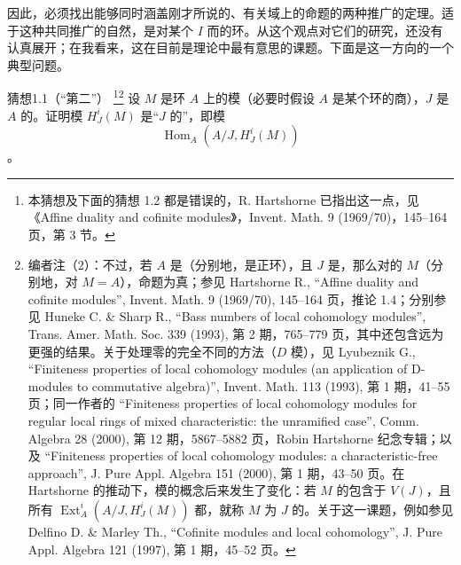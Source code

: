 因此，必须找出能够同时涵盖刚才所说的、有关域上的命题的两种推广的定理。适于这种共同推广的自然，是对某个 $I$ 而的环。从这个观点对它们的研究，还没有认真展开；在我看来，这在目前是理论中最有意思的课题。下面是这一方向的一个典型问题。

\begin{SGAresult}{猜想}{1.1（“第二”）}
\footnote{本猜想及下面的猜想 1.2 都是错误的，R. Hartshorne 已指出这一点，见《Affine duality and cofinite modules》，Invent. Math. 9 (1969/70)，145--164 页，第 3 节。}\footnote{编者注（2）：不过，若 $A$ 是（分别地，是正环），且 $J$ 是，那么对的 $M$（分别地，对 $M=A$），命题为真；参见 Hartshorne R., “Affine duality and cofinite modules”, Invent. Math. 9 (1969/70), 145--164 页，推论 1.4；分别参见 Huneke C. \& Sharp R., “Bass numbers of local cohomology modules”, Trans. Amer. Math. Soc. 339 (1993), 第 2 期，765--779 页，其中还包含远为更强的结果。关于处理零的完全不同的方法（$D$ 模），见 Lyubeznik G., “Finiteness properties of local cohomology modules (an application of D-modules to commutative algebra)”, Invent. Math. 113 (1993), 第 1 期，41--55 页；同一作者的 “Finiteness properties of local cohomology modules for regular local rings of mixed characteristic: the unramified case”, Comm. Algebra 28 (2000), 第 12 期，5867--5882 页，Robin Hartshorne 纪念专辑；以及 “Finiteness properties of local cohomology modules: a characteristic-free approach”, J. Pure Appl. Algebra 151 (2000), 第 1 期，43--50 页。在 Hartshorne 的推动下，模的概念后来发生了变化：若 $M$ 的包含于 $V(J)$，且所有 $\operatorname{Ext}^i_A(A/J,H^i_J(M))$ 都，就称 $M$ 为 $J$ 的。关于这一课题，例如参见 Delfino D. \& Marley Th., “Cofinite modules and local cohomology”, J. Pure Appl. Algebra 121 (1997), 第 1 期，45--52 页。}
设 $M$ 是环 $A$ 上的模（必要时假设 $A$ 是某个环的商），$J$ 是 $A$ 的。证明模 $H^i_J(M)$ 是“$J$ 的”，即模
\[
\operatorname{Hom}_A(A/J,H^i_J(M))
\]
。
\end{SGAresult}

